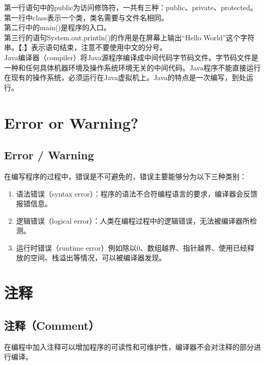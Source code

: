 第一行语句中的public为访问修饰符，一共有三种：public、private、protected。第一行中class表示一个类，类名需要与文件名相同。\\

第二行中的main()是程序的入口。\\

第三行的语句System.out.println()的作用是在屏幕上输出“Hello World”这个字符串。【;】表示语句结束，注意不要使用中文的分号。\\

Java编译器（compiler）将Java源程序编译成中间代码字节码文件。字节码文件是一种和任何具体机器环境及操作系统环境无关的中间代码。Java程序不能直接运行在现有的操作系统，必须运行在Java虚拟机上。Java的特点是一次编写，到处运行。

\newpage

\section{Error or Warning?}

\subsection{Error / Warning}

在编写程序的过程中，错误是不可避免的，错误主要能够分为以下三种类别：

\begin{enumerate}
	\item 语法错误（syntax error）：程序的语法不合符编程语言的要求，编译器会反馈报错信息。

	\item 逻辑错误（logical error）：人类在编程过程中的逻辑错误，无法被编译器所检测。

	\item 运行时错误（runtime error）例如除以0、数组越界、指针越界、使用已经释放的空间、栈溢出等情况，可以被编译器发现。
\end{enumerate}

\newpage

\section{注释}

\subsection{注释（Comment）}

在编程中加入注释可以增加程序的可读性和可维护性，编译器不会对注释的部分进行编译。\\

